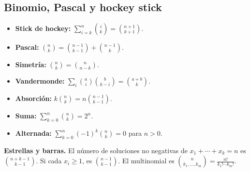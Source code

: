 \subsection{Binomio, Pascal y hockey stick}\label{rec:binomio}

\begin{itemize}[leftmargin=1.05em,itemsep=1pt,topsep=1pt]
  \item \textbf{Stick de hockey:}
        $\displaystyle\sum_{i=k}^{n}\binom{i}{k}=\binom{n+1}{k+1}$.
  \item \textbf{Pascal:}
        $\binom{n}{k}=\binom{n-1}{k-1}+\binom{n-1}{k}$.
  \item \textbf{Simetría:} $\binom{n}{k}=\binom{n}{n-k}$.
  \item \textbf{Vandermonde:}
        $\displaystyle\sum_i\binom{a}{i}\binom{b}{k-i}=\binom{a+b}{k}$.
  \item \textbf{Absorción:}
        $k\binom{n}{k}=n\binom{n-1}{k-1}$.
  \item \textbf{Suma:} $\displaystyle\sum_{k=0}^{n}\binom{n}{k}=2^n$.
  \item \textbf{Alternada:}
        $\displaystyle\sum_{k=0}^{n}(-1)^k\binom{n}{k}=0$ para $n>0$.
\end{itemize}

\textbf{Estrellas y barras.} El número de soluciones no negativas de
$x_1+\cdots+x_k=n$ es $\binom{n+k-1}{k-1}$. Si cada $x_i\ge 1$, es
$\binom{n-1}{k-1}$. El multinomial es
$\binom{n}{k_1,\dots,k_m}=\frac{n!}{k_1!\cdots k_m!}$.
